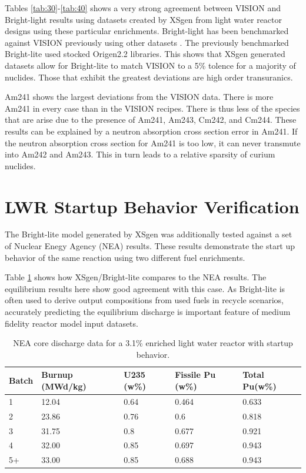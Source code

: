 \documentclass{article}
\begin{document}
Tables \ref{tab:30}-\ref{tab:40} shows a very strong agreement between VISION and Bright-light
results using datasets created by XSgen from light water reactor designs using these particular
enrichments. Bright-light has been benchmarked against VISION previously using other datasets
\cite{brightlite}. The previously benchmarked Bright-lite used stocked Origen2.2 libraries\cite{origen2}. This shows that
XSgen generated datasets allow for Bright-lite to match VISION to a 5\% tolence for a
majority of nuclides. Those that exhibit the greatest deviations are high order transuranics.

Am241 shows the largest deviations from the VISION data. There is more Am241 in every
case than in the VISION recipes. There is thus less of the species that are arise due to
the presence of Am241, Am243, Cm242, and Cm244. These results can be explained by a
neutron absorption cross section error in Am241. If the neutron absorption cross section for
Am241 is too low, it can never transmute into Am242 and Am243. This in turn leads to a
relative sparsity of curium nuclides.

\section{LWR Startup Behavior Verification}

The Bright-lite model generated by XSgen was additionally tested against a set of
Nuclear Enegy Agency (NEA) results\cite{nea}. These results demonstrate the start up behavior
of the same reaction using two different fuel enrichments.

Table \ref{tab:b} shows how XSgen/Bright-lite compares to the NEA results.
The equilibrium results here show good agreement with this case. As Bright-lite is often
used to derive output compositions from used fuels in recycle scenarios, accurately
predicting the equilibrium discharge is important feature of medium fidelity reactor model
input datasets.

\begin{table}[!htb]
\centering
\caption{NEA core discharge data for a 3.1\% enriched light water reactor with startup behavior.}
\label{tab:b}
\begin{tabular}{lllll}
Batch & Burnup (MWd/kg) & U235 (w\%) & Fissile Pu (w\%) & Total Pu(w\%) \\
\hline
1 & 12.04 & 0.64 & 0.464 & 0.633 \\
2 & 23.86 & 0.76 & 0.6 & 0.818 \\
3 & 31.75 & 0.8 & 0.677 & 0.921 \\
4 & 32.00 & 0.85 & 0.697 & 0.943 \\
5+ & 33.00 & 0.85 & 0.688 & 0.943
\end{tabular}
\end{table}
\end{document}
